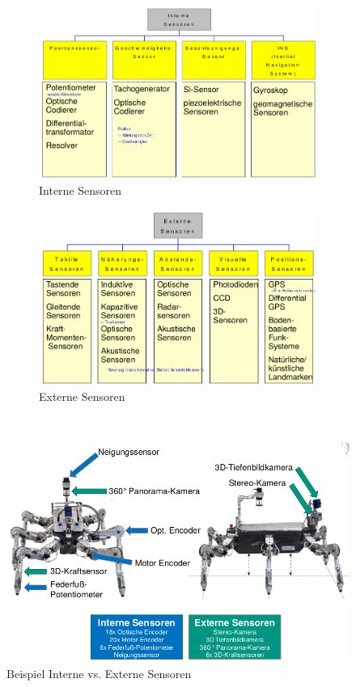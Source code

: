 \begin{figure}[h!]
	\begin{subfigure}{.5\textwidth}
		\includegraphics[width=\linewidth]{figures/ch04_intern.png}
		\caption{Interne Sensoren}
	\end{subfigure}
	\begin{subfigure}{.5\textwidth}
		\includegraphics[width=\linewidth]{figures/ch04_extern.png}
		\caption{Externe Sensoren}
	\end{subfigure}
	\caption{}
	\label{intext}
\end{figure}\\
\begin{figure}[h!]
	\centering
	\includegraphics[width=0.5\linewidth]{figures/ch04_intext.png}
	\caption{Beispiel Interne vs. Externe Sensoren}
	\label{intextbsp}
\end{figure}\\
